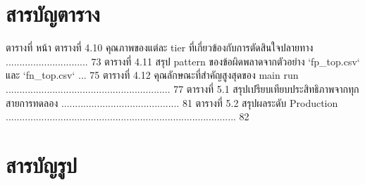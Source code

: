 \documentclass[12pt,a4paper]{report}
\begin{document}
\clearpage
\section*{สารบัญตาราง}
ตารางที่ หน้า ตารางที่ 4.10 คุณภาพของแต่ละ tier ที่เกี่ยวข้องกับการตัดสินใจปลายทาง .............................. 73 ตารางที่ 4.11 สรุป pattern ของข้อผิดพลาดจากตัวอย่าง `fp\_top.csv` และ `fn\_top.csv` ... 75 ตารางที่ 4.12 คุณลักษณะที่สำคัญสูงสุดของ main run ............................................................ 77 ตารางที่ 5.1 สรุปเปรียบเทียบประสิทธิภาพจากทุกสายการทดลอง ........................................... 81 ตารางที่ 5.2 สรุปผลระดับ Production .................................................................................... 82\par
\clearpage
\section*{สารบัญรูป}
\end{document}
